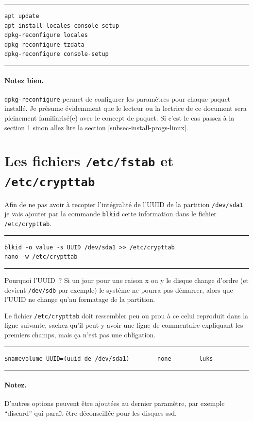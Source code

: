 \documentclass[12pt, a4paper]{report}
\begin{document}
\noindent \rule{\linewidth}{0.5pt}
\begin{verbatim}
apt update
apt install locales console-setup
dpkg-reconfigure locales
dpkg-reconfigure tzdata
dpkg-reconfigure console-setup
\end{verbatim}
\rule{\linewidth}{0.5pt}

\paragraph{Notez bien.} \texttt{dpkg-reconfigure} permet de configurer les paramètres pour chaque paquet installé. 
Je présume évidemment que le lecteur ou la lectrice de ce document sera pleinement familiarisé(e) avec le concept de paquet. Si c'est le cas passez à la section \ref{subsec-crypttab-fstab} sinon allez lire la section \ref{subsec-install-progs-linux}.

\section{Les fichiers \texttt{/etc/fstab} et \texttt{/etc/crypttab}} \label{subsec-crypttab-fstab}
Afin de ne pas avoir à recopier l'intégralité de l'UUID de la partition \texttt{/dev/sda1} je vais ajouter par la commande \texttt{blkid} cette information dans le fichier \texttt{/etc/crypttab}.

\noindent \rule{\linewidth}{0.5pt}
\begin{verbatim}
blkid -o value -s UUID /dev/sda1 >> /etc/crypttab
nano -w /etc/crypttab
\end{verbatim}
\rule{\linewidth}{0.5pt}

Pourquoi l'UUID~? Si un jour pour une raison x ou y le disque change d'ordre (et devient \texttt{/dev/sdb} par exemple) le système ne pourra pas démarrer, alors que l'UUID ne change qu'au formatage de la partition.

Le fichier \texttt{/etc/crypttab} doit ressembler peu ou prou à ce celui reproduit dans la ligne suivante, sachez qu'il peut y avoir une ligne de commentaire expliquant les premiers champs, mais ça n'est pas une obligation.

\noindent \rule{\linewidth}{0.5pt}
\begin{verbatim}
$namevolume	UUID=(uuid de /dev/sda1)		none		luks
\end{verbatim}
\rule{\linewidth}{0.5pt}

\paragraph{Notez.} D'autres options peuvent être ajoutées au dernier paramètre, par exemple ``discard'' qui paraît être déconseillée pour les disques ssd.
\end{document}
